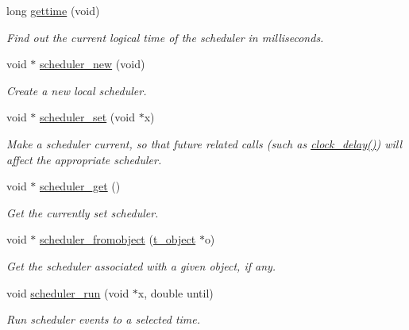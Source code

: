 \begin{DoxyCompactItemize}
long \hyperlink{group__clocks_gabe5d8b1c9f260d13734a328b2a60ff69}{gettime} (void)
\begin{DoxyCompactList}\small\item\em Find out the current logical time of the scheduler in milliseconds. \item\end{DoxyCompactList}\item 
void $\ast$ \hyperlink{group__clocks_ga90e58fdc4b6aa7a1485220d808d6fc4b}{scheduler\_\-new} (void)
\begin{DoxyCompactList}\small\item\em Create a new local scheduler. \item\end{DoxyCompactList}\item 
void $\ast$ \hyperlink{group__clocks_gae6fc77faa65e6f80a26f072b2b17b31b}{scheduler\_\-set} (void $\ast$x)
\begin{DoxyCompactList}\small\item\em Make a scheduler current, so that future related calls (such as \hyperlink{group__clocks_ga9ac56d198904627333de740743086920}{clock\_\-delay()}) will affect the appropriate scheduler. \item\end{DoxyCompactList}\item 
void $\ast$ \hyperlink{group__clocks_ga7f67cd4fe41445e1d11afe84742a6d5f}{scheduler\_\-get} ()
\begin{DoxyCompactList}\small\item\em Get the currently set scheduler. \item\end{DoxyCompactList}\item 
void $\ast$ \hyperlink{group__clocks_ga18134769aacb89b12258898166a99ff2}{scheduler\_\-fromobject} (\hyperlink{structt__object}{t\_\-object} $\ast$o)
\begin{DoxyCompactList}\small\item\em Get the scheduler associated with a given object, if any. \item\end{DoxyCompactList}\item 
void \hyperlink{group__clocks_ga69f8d9f511899d3f4b30f6b7a032849a}{scheduler\_\-run} (void $\ast$x, double until)
\begin{DoxyCompactList}\small\item\em Run scheduler events to a selected time. \item\end{DoxyCompactList}\item 

\end{DoxyCompactItemize}
